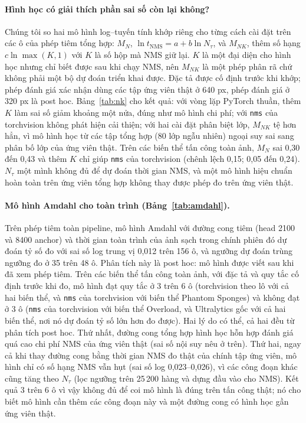 \documentclass[12pt,a4paper]{article}
\newcommand{\Ntau}{N_{\tau}}
\begin{document}
\paragraph{Hình học có giải thích phần sai số còn lại không?}
\label{sec:nk}
Chúng tôi so hai mô hình log--tuyến tính khớp riêng cho từng cách cài đặt trên các ô của phép tiêm tổng hợp: $M_N$, $\ln t_{\mathrm{NMS}} = a + b\ln\Ntau$, và $M_{NK}$, thêm số hạng $c\ln\max(K,1)$ với $K$ là số hộp mà NMS giữ lại. $K$ là một đại diện cho hình học nhưng chỉ biết được sau khi chạy NMS, nên $M_{NK}$ là một phép phân rã chứ không phải một bộ dự đoán triển khai được. Đặc tả được cố định trước khi khớp; phép đánh giá xác nhận dùng các tập ứng viên thật ở 640 px, phép đánh giá ở 320 px là post hoc. Bảng~\ref{tab:nk} cho kết quả: với vòng lặp PyTorch thuần, thêm $K$ làm sai số giảm khoảng một nửa, đúng như mô hình chi phí; với \texttt{nms} của torchvision không phát hiện cải thiện; với hai cài đặt phân biệt lớp, $M_{NK}$ tệ hơn hẳn, vì mô hình học từ các tập tổng hợp (80 lớp ngẫu nhiên) ngoại suy sai sang phân bố lớp của ứng viên thật. Trên các biến thể tấn công toàn ảnh, $M_N$ sai 0,30 đến 0,43 và thêm $K$ chỉ giúp \texttt{nms} của torchvision (chênh lệch 0,15; 0,05 đến 0,24). $\Ntau$ một mình không đủ để dự đoán thời gian NMS, và một mô hình hiệu chuẩn hoàn toàn trên ứng viên tổng hợp không thay được phép đo trên ứng viên thật.



\paragraph{Mô hình Amdahl cho toàn trình (Bảng~\ref{tab:amdahl}).}
Trên phép tiêm toàn pipeline, mô hình Amdahl với đường cong tiêm (head 2100 và 8400 anchor) và thời gian toàn trình của ảnh sạch trong chính phiên đó dự đoán tỷ số đo với sai số log trung vị 0,012 trên 156 ô, và ngưỡng dự đoán trùng ngưỡng đo ở 35 trên 48 ô. Phân tích này là post hoc: mô hình được viết sau khi đã xem phép tiêm. Trên các biến thể tấn công toàn ảnh, với đặc tả và quy tắc cố định trước khi đo, mô hình đạt quy tắc ở 3 trên 6 ô (torchvision theo lô với cả hai biến thể, và \texttt{nms} của torchvision với biến thể Phantom Sponges) và không đạt ở 3 ô (\texttt{nms} của torchvision với biến thể Overload, và Ultralytics gốc với cả hai biến thể, nơi nó dự đoán tỷ số lớn hơn đo được). Hai lý do có thể, cả hai đều từ phân tích post hoc. Thứ nhất, đường cong tổng hợp hình học hỗn hợp đánh giá quá cao chi phí NMS của ứng viên thật (sai số nội suy nêu ở trên). Thứ hai, ngay cả khi thay đường cong bằng thời gian NMS đo thật của chính tập ứng viên, mô hình chỉ có số hạng NMS vẫn hụt (sai số log 0,023--0,026), vì các công đoạn khác cũng tăng theo $\Ntau$ (lọc ngưỡng trên 25\,200 hàng và dựng đầu vào cho NMS). Kết quả 3 trên 6 ô vì vậy không đủ để coi mô hình là đúng trên tấn công thật; nó cho biết mô hình cần thêm các công đoạn này và một đường cong có hình học gần ứng viên thật.
\end{document}
